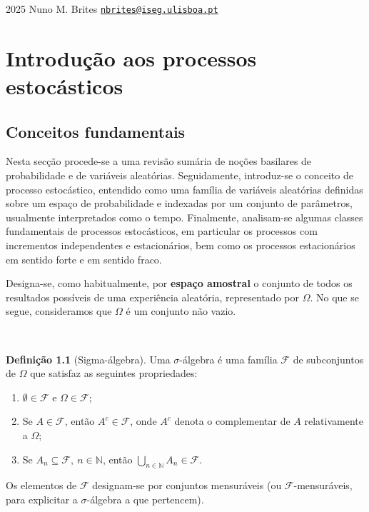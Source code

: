 \documentclass[
  11pt,
  a4paper,
]{book}
\theoremstyle{definition}
\newtheorem{definition}{Definição}[chapter]
\theoremstyle{definition}
\theoremstyle{definition}
\theoremstyle{definition}
\theoremstyle{remark}
\begin{document}
2025 \textbar{} Nuno M. Brites \textbar{}
\href{mailto:nbrites@iseg.ulisboa.pt}{\nolinkurl{nbrites@iseg.ulisboa.pt}}

\chapter{Introdução aos processos estocásticos}\label{introducao-aos-processos-estocasticos}

\section{Conceitos fundamentais}\label{conceitos-fundamentais}

Nesta secção procede-se a uma revisão sumária de noções basilares de probabilidade e de variáveis aleatórias. Seguidamente, introduz-se o conceito de processo estocástico, entendido como uma família de variáveis aleatórias definidas sobre um espaço de probabilidade e indexadas por um conjunto de parâmetros, usualmente interpretados como o tempo. Finalmente, analisam-se algumas classes fundamentais de processos estocásticos, em particular os processos com incrementos independentes e estacionários, bem como os processos estacionários em sentido forte e em sentido fraco.

Designa-se, como habitualmente, por \textbf{espaço amostral} o conjunto de todos os resultados possíveis de uma experiência aleatória, representado por \(\Omega\). No que se segue, consideramos que \(\Omega\) é um conjunto não vazio.

\(\,\)

\begin{definition}[Sigma-álgebra]
Uma \(\sigma\)-álgebra é uma família \(\mathcal{F}\) de subconjuntos de \(\Omega\) que satisfaz as seguintes propriedades:

\begin{enumerate}
\def\labelenumi{\roman{enumi})}
\item
  \(\emptyset \in \mathcal{F}\) e \(\Omega \in \mathcal{F}\);
\item
  Se \(A \in \mathcal{F}\), então \(A^c \in \mathcal{F}\), onde \(A^c\) denota o complementar de \(A\) relativamente a \(\Omega\);
\item
  Se \(A_n \subseteq \mathcal{F}, ~n \in \mathbb{N}\), então \(\displaystyle \bigcup_{n \in \mathbb{N}} A_n \in \mathcal{F}\).
\end{enumerate}

Os elementos de \(\mathcal{F}\) designam-se por conjuntos mensuráveis (ou \(\mathcal{F}\)-mensuráveis, para explicitar a \(\sigma\)-álgebra a que pertencem).
\end{definition}
\end{document}

